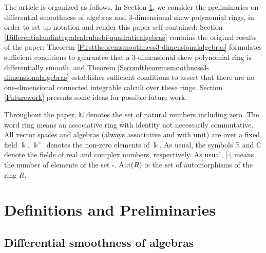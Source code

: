 \documentclass{amsart}
\theoremstyle{definition}
\theoremstyle{remark}
\numberwithin{equation}{section}
\begin{document}
The article is organized as follows. In Section \ref{PreliminariesDifferentialsmoothnessofbi-quadraticalgebras}, we consider the preliminaries on differential smoothness of algebras and 3-dimensional skew polynomial rings, in order to set up notation and render this paper self-contained. Section \ref{Differentialandintegralcalculusbi-quadraticalgebras} contains the original results of the paper: Theorem \ref{Firsttheoremsmoothness3-dimensionalalgebras} formulates sufficient conditions to guarantee that a 3-dimensional skew polynomial ring is differentially smooth, and Theorem \ref{Secondtheoremsmoothness3-dimensionalalgebras} establishes sufficient conditions to assert that there are no one-dimensional connected integrable calculi over these rings. Section \ref{Futurework} presents some ideas for possible future work.

Throughout the paper, $\mathbb{N}$ denotes the set of natural numbers including zero. The word ring means an associative ring with identity not necessarily commutative. All vector spaces and algebras (always associative and with unit) are over a fixed field $\Bbbk$. $\Bbbk^{\times}$ denotes the non-zero elements of $\Bbbk$. As usual, the symbols $\mathbb{R}$ and $\mathbb{C}$ denote the fields of real and complex numbers, respectively. As usual, $|\square|$ means the number of elements of the set $\square$. ${\rm Aut}(R)$ is the set of automorphisms of the ring $R$.


\section{Definitions and Preliminaries}\label{PreliminariesDifferentialsmoothnessofbi-quadraticalgebras}

\subsection{Differential smoothness of algebras}\label{DefinitionsandpreliminariesDSA}

\end{document}
